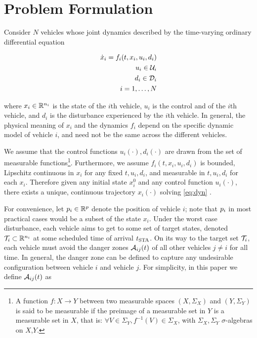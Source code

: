 \section{Problem Formulation \label{sec:formulation}}
Consider $N$ vehicles whose joint dynamics described by the time-varying ordinary differential equation

\begin{equation}
\label{eq:dyn}
\begin{aligned}
\dot{x}_i = f_i(t, x_i, u_i, d_i) \\
u_i \in \mathcal{U}_i \\
d_i \in \mathcal{D}_i \\
i = 1,\ldots, N
\end{aligned}
\end{equation}

where $x_i \in \mathbb{R}^{n_i}$ is the state of the $i$th vehicle, $u_i$ is the control and of the $i$th vehicle, and $d_i$ is the disturbance experienced by the $i$th vehicle. In general, the physical meaning of $x_i$ and the dynamics $f_i$ depend on the specific dynamic model of vehicle $i$, and need not be the same across the different vehicles. 

We assume that the control functions $u_i(\cdot), d_i(\cdot)$ are drawn from the set of measurable functions\footnote{
A function $f:X\to Y$ between two measurable spaces $(X,\Sigma_X)$ and $(Y,\Sigma_Y)$ is said to be measurable if the preimage of a measurable set in $Y$ is a measurable set in $X$, that is: $\forall V\in\Sigma_Y, f^{-1}(V)\in\Sigma_X$, with $\Sigma_X,\Sigma_Y$ $\sigma$-algebras on $X$,$Y$.}. Furthermore, we assume $f_i(t,x_i, u_i, d_i)$ is bounded, Lipschitz continuous in $x_i$ for any fixed $t, u_i, d_i$, and measurable in $t, u_i, d_i$ for each $x_i$. Therefore given any initial state $x_i^0$ and any control function $u_i(\cdot)$, there exists a unique, continuous trajectory $x_i(\cdot)$ solving \eqref{eq:dyn} \cite{Coddington55}.

For convenience, let $p_i \in \mathbb{R}^p$ denote the position of vehicle $i$; note that $p_i$ in most practical cases would be a subset of the state $x_i$. Under the worst case disturbance, each vehicle aims to get to some set of target states, denoted $\mathcal{T}_i \subset \mathbb{R}^{n_i}$ at some scheduled time of arrival $t_\text{STA}$. On its way to the target set $\mathcal{T}_i$, each vehicle must avoid the danger zones $\mathcal{A}_{ij}(t)$ of all other vehicles $j\neq i$ for all time. In general, the danger zone can be defined to capture any undesirable configuration between vehicle $i$ and vehicle $j$. For simplicity, in this paper we define $\mathcal{A}_{ij}(t)$ as

